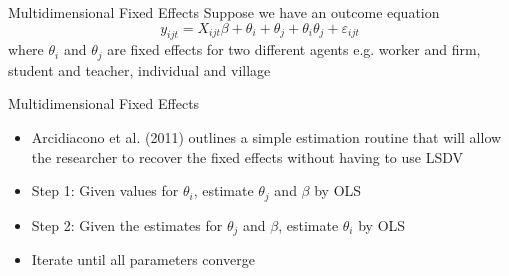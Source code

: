 \documentclass[english,xcolor=dvipsnames]{beamer}
\begin{document}
\begin{frame}{Multidimensional Fixed Effects}
Suppose we have an outcome equation 
\[
y_{ijt} = X_{ijt}\beta + \theta_{i} + \theta_{j} + \theta_{i} \theta_{j} + \varepsilon_{ijt}
\]
where $\theta_{i}$ and $\theta_{j}$ are fixed effects for two different agents e.g. worker and firm, student and teacher, individual and village
\end{frame}

\begin{frame}{Multidimensional Fixed Effects}
\begin{itemize}
	\item Arcidiacono et al. (2011) outlines a simple estimation routine that will allow the researcher to recover the fixed effects without having to use LSDV
	\item Step 1: Given values for $\theta_{i}$, estimate $\theta_{j}$ and $\beta$ by OLS
	\item Step 2: Given the estimates for $\theta_{j}$ and $\beta$, estimate $\theta_{i}$ by OLS
	\item Iterate until all parameters converge
\end{itemize}
\end{frame}
\end{document}
